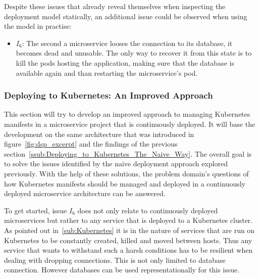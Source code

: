 Despite these issues that already reveal themselves when inspecting the
deployment model statically, an additional issue could be observed when using
the model in practise:

\begin{itemize}
  \item \textit{$I_6$}: The second a microservice looses the connection to its
    database, it becomes dead and unusable. The only way to recover it from
    this state is to kill the pods hosting the application, making sure that
    the database is available again and than restarting the microservice's pod.
\end{itemize}

\subsubsection{Deploying to Kubernetes: An Improved Approach}%
\label{ssub:Deploying_to_Kubernetes_An_Improved_Approach}

This section will try to develop an improved approach to managing Kubernetes
manifests in a microservice project that is continuously deployed. It will base
the development on the same architecture that was introduced in
figure~\ref{fig:dsp_excerpt} and the findings of the previous
section~\ref{ssub:Deploying_to_Kubernetes_The_Naive_Way}. The overall goal is
to solve the issues identified by the naive deployment approach explored
previously. With the help of these solutions, the problem domain's questions of
how Kubernetes manifests should be managed and deployed in a continuously
deployed microservice architecture can be answered.

To get started, issue $I_6$ does not only relate to continuously deployed
microservices but rather to any service that is deployed to a Kubernetes
cluster. As pointed out in~\ref{sub:Kubernetes} it is in the nature of services
that are run on Kubernetes to be constantly created, killed and moved between
hosts. Thus any service that wants to withstand such a harsh conditions has to
be resilient when dealing with dropping connections. This is not only limited
to database connection. However databases can be used representationally for
this issue.


